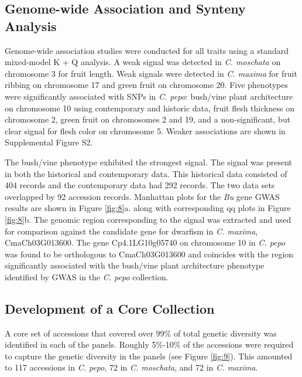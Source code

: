 \documentclass[utf8]{FrontiersinHarvard} %
\begin{document}
\subsection{Genome-wide Association and Synteny Analysis}
Genome-wide association studies were conducted for all traits using a standard mixed-model K + Q  analysis. A weak signal was detected in \textit{C. moschata} on chromosome 3 for fruit length. Weak signals were detected in \textit{C. maxima} for fruit ribbing on chromosome 17 and green fruit on chromosome 20. Five phenotypes were significantly associated with SNPs in \textit{C. pepo}: bush/vine plant architecture on chromosome 10 using contemporary and historic data, fruit flesh thickness on chromosome 2, green fruit on chromosomes 2 and 19, and a non-significant, but clear signal for flesh color on chromosome 5. Weaker associations are shown in Supplemental Figure S2.

The bush/vine phenotype exhibited the strongest signal. The signal was present in both the historical and contemporary data. This historical data consisted of 404 records and the contemporary data had 292 records. The two data sets overlapped by 92 accession records. Manhattan plots for the \textit{Bu} gene GWAS results are shown in Figure \ref{fig:8}a. along with corresponding qq plots in Figure \ref{fig:8}b. The genomic region corresponding to the signal was extracted and used for comparison against the candidate gene for dwarfism in \textit{C. maxima}, CmaCh03G013600. The gene Cp4.1LG10g05740 on chromosome 10 in \textit{C. pepo} was found to be orthologous to CmaCh03G013600 and coincides with the region significantly associated with the bush/vine plant architecture phenotype identified by GWAS in the \textit{C. pepo} collection. 

\subsection{Development of a Core Collection}
A core set of accessions that covered over 99\% of total genetic diversity was identified in each of the panels. Roughly 5\%-10\% of the accessions were required to capture the genetic diversity in the panels (see Figure \ref{fig:9}). This amounted to 117 accessions in \textit{C. pepo}, 72 in \textit{C. moschata}, and 72 in \textit{C. maxima}.
\end{document}
